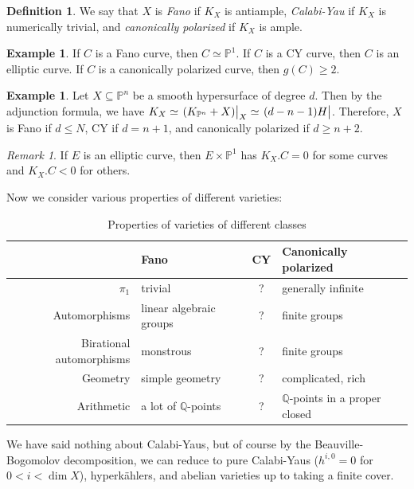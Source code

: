 \documentclass[leqno, openany]{memoir}
\theoremstyle{definition}
\newtheorem{defn}[thm]{Definition}
\newtheorem{exm}[thm]{Example}
\theoremstyle{remark}
\newtheorem{rmk}[thm]{Remark}
\theoremstyle{plain}
\theoremstyle{definition}
\theoremstyle{remark}
\newcommand{\Q}{\mathbb{Q}}
\renewcommand{\P}{\mathbb{P}}
\begin{document}
\begin{defn}
    We say that $X$ is \textit{Fano} if $K_X$ is antiample, \textit{Calabi-Yau} if $K_X$ is numerically trivial, and \textit{canonically polarized} if $K_X$ is ample.
\end{defn}

\begin{exm}
    If $C$ is a Fano curve, then $C \simeq \P^1$. If $C$ is a CY curve, then $C$ is an elliptic curve. If $C$ is a canonically polarized curve, then $g(C) \geq 2$.
\end{exm}

\begin{exm}
    Let $X \subseteq \P^n$ be a smooth hypersurface of degree $d$. Then by the adjunction formula, we have $K_X \simeq \eval{(K_{\P^n} + X)}_X \simeq \eval{(d-n-1)H}$. Therefore, $X$ is Fano if $d \leq N$, CY if $d = n+1$, and canonically polarized if $d \geq n+2$.
\end{exm}

\begin{rmk}
    If $E$ is an elliptic curve, then $E \times \P^1$ has $K_X . C = 0$ for some curves and $K_X . C < 0$ for others.
\end{rmk}

Now we consider various properties of different varieties:
\begin{table}[H]
    \centering
    \caption{Properties of varieties of different classes}
    \label{tab:label}
    \begin{tabular}{rlcl}
    \toprule
    & Fano & CY & Canonically polarized \\
    \midrule
        $\pi_1$ & trivial & {?} & generally infinite \\
        Automorphisms & linear algebraic groups & {?} & finite groups \\
        Birational automorphisms & monstrous & {?} & finite groups \\
        Geometry & simple geometry & {?} & complicated, rich \\
        Arithmetic & a lot of $\Q$-points & {?} & $\Q$-points in a proper closed \\
        \bottomrule
    \end{tabular}
\end{table}
We have said nothing about Calabi-Yaus, but of course by the Beauville-Bogomolov decomposition, we can reduce to pure Calabi-Yaus ($h^{i,0} = 0$ for $0 < i < \dim X$), hyperk\"ahlers, and abelian varieties up to taking a finite cover.
\end{document}
